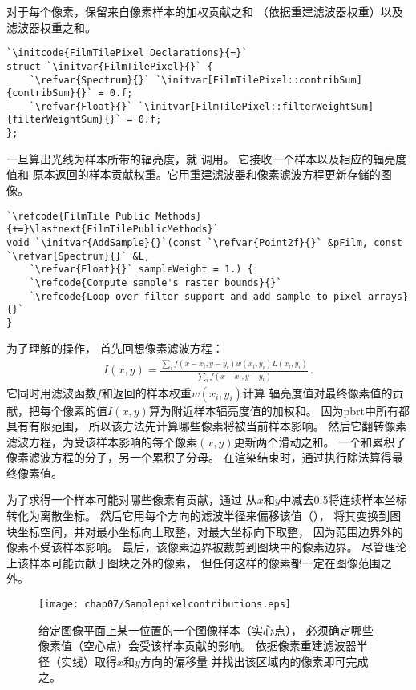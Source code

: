 对于每个像素，保留来自像素样本的加权贡献之和
（依据重建滤波器权重）以及滤波器权重之和。
\begin{lstlisting}
`\initcode{FilmTilePixel Declarations}{=}`
struct `\initvar{FilmTilePixel}{}` {
    `\refvar{Spectrum}{}` `\initvar[FilmTilePixel::contribSum]{contribSum}{}` = 0.f;
    `\refvar{Float}{}` `\initvar[FilmTilePixel::filterWeightSum]{filterWeightSum}{}` = 0.f;
};
\end{lstlisting}

一旦算出光线为样本所带的辐亮度，就
调用。
它接收一个样本以及相应的辐亮度值和
原本返回的样本贡献权重。它用重建滤波器和像素滤波方程更新存储的图像。
\begin{lstlisting}
`\refcode{FilmTile Public Methods}{+=}\lastnext{FilmTilePublicMethods}`
void `\initvar{AddSample}{}`(const `\refvar{Point2f}{}` &pFilm, const `\refvar{Spectrum}{}` &L,
    `\refvar{Float}{}` sampleWeight = 1.) {
    `\refcode{Compute sample's raster bounds}{}`
    `\refcode{Loop over filter support and add sample to pixel arrays}{}`
}
\end{lstlisting}

为了理解的操作，
首先回想像素滤波方程：
\begin{align*}
    I(x,y)=\frac{\sum\limits_i{f(x-x_i,y-y_i)w(x_i,y_i)L(x_i,y_i)}}{\sum\limits_i{f(x-x_i,y-y_i)}}\, .
\end{align*}
它同时用滤波函数$f$和返回的样本权重$w(x_i,y_i)$计算
辐亮度值对最终像素值的贡献，把每个像素的值$I(x,y)$算为附近样本辐亮度值的加权和。
因为pbrt中所有都具有有限范围，
所以该方法先计算哪些像素将被当前样本影响。
然后它翻转像素滤波方程，为受该样本影响的每个像素$(x,y)$更新两个滑动之和。
一个和累积了像素滤波方程的分子，另一个累积了分母。
在渲染结束时，通过执行除法算得最终像素值。

为了求得一个样本可能对哪些像素有贡献，通过
从$x$和$y$中减去0.5将连续样本坐标转化为离散坐标。
然后它用每个方向的滤波半径来偏移该值（），
将其变换到图块坐标空间，并对最小坐标向上取整，对最大坐标向下取整，
因为范围边界外的像素不受该样本影响。
最后，该像素边界被裁剪到图块中的像素边界。
尽管理论上该样本可能贡献于图块之外的像素，
但任何这样的像素都一定在图像范围之外。
\begin{figure}[htbp]
    \centering\texttt{[image: chap07/Samplepixelcontributions.eps]}
    \caption{给定图像平面上某一位置的一个图像样本（实心点），
    必须确定哪些像素值（空心点）会受该样本贡献的影响。
    依据像素重建滤波器半径（实线）取得$x$和$y$方向的偏移量
    并找出该区域内的像素即可完成之。}
    \label{fig:7.48}
\end{figure}

